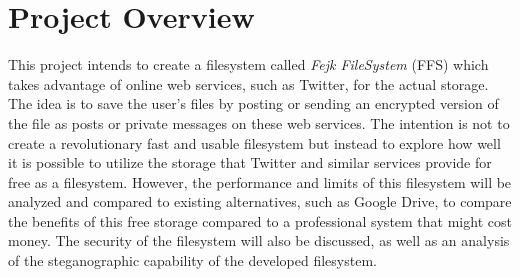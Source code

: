 \section{Project Overview}

This project intends to create a filesystem called \textit{Fejk FileSystem} (FFS) which takes advantage of online web services, such as Twitter, for the actual storage. The idea is to save the user's files by posting or sending an encrypted version of the file as posts or private messages on these web services. The intention is not to create a revolutionary fast and usable filesystem but instead to explore how well it is possible to utilize the storage that Twitter and similar services provide for free as a filesystem. However, the performance and limits of this filesystem will be analyzed and compared to existing alternatives, such as Google Drive, to compare the benefits of this free storage compared to a professional system that might cost money. The security of the filesystem will also be discussed, as well as an analysis of the steganographic capability of the developed filesystem.